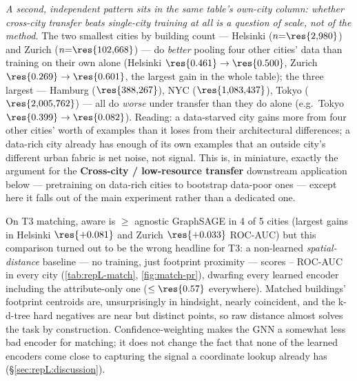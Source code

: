 \emph{A second, independent pattern sits in the same table's own-city column:
whether cross-city transfer beats single-city training at all is a question of
scale, not of the method.} The two smallest cities by building count ---
Helsinki ($n{=}\res{2{,}980}$) and Zurich ($n{=}\res{102{,}668}$) --- do
\emph{better} pooling four other cities' data than training on their own
alone (Helsinki $\res{0.461}\to\res{0.500}$, Zurich $\res{0.269}\to\res{0.601}$,
the largest gain in the whole table); the three largest --- Hamburg
($\res{388{,}267}$), NYC ($\res{1{,}083{,}437}$), Tokyo
($\res{2{,}005{,}762}$) --- all do \emph{worse} under transfer than they do
alone (e.g.\ Tokyo $\res{0.399}\to\res{0.082}$). Reading: a data-starved city
gains more from four other cities' worth of examples than it loses from their
architectural differences; a data-rich city already has enough of its own
examples that an outside city's different urban fabric is net noise, not
signal. This is, in miniature, exactly the argument for the \textbf{Cross-city
/ low-resource transfer} downstream application below --- pretraining on
data-rich cities to bootstrap data-poor ones --- except here it falls out of
the main experiment rather than a dedicated one.

On T3 matching, aware is $\ge$ agnostic GraphSAGE in 4 of 5 cities (largest
gains in Helsinki $\res{+0.081}$ and Zurich $\res{+0.033}$ ROC-AUC) but this
comparison turned out to be the wrong headline for T3: a non-learned
\emph{spatial-distance} baseline --- no training, just footprint proximity ---
scores -- ROC-AUC in every city (\cref{tab:repL-match},
\cref{fig:match-pr}), dwarfing every learned encoder including the
attribute-only one ($\le\res{0.57}$ everywhere). Matched buildings' footprint
centroids are, unsurprisingly in hindsight, nearly coincident, and the k-d-tree
hard negatives are near but distinct points, so raw distance almost solves the
task by construction. Confidence-weighting makes the GNN a somewhat less bad
encoder for matching; it does not change the fact that none of the learned
encoders come close to capturing the signal a coordinate lookup already has
(\S\ref{sec:repL:discussion}).

